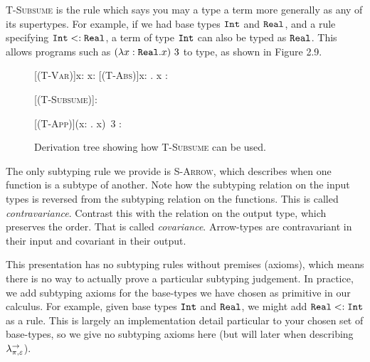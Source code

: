 \textsc{T-Subsume} is the rule which says you may a type a term more generally as any of its supertypes. For example, if we had base types $\mathtt{Int}$ and $\mathtt{Real}$, and a rule specifying $\mathtt{Int} <: \mathtt{Real}$, a term of type $\mathtt{Int}$ can also be typed as $\mathtt{Real}$. This allows programs such as $(\lambda x: \mathtt{Real}. x)~3$ to type, as shown in Figure 2.9.

\begin{figure}[h]


    \begin{prooftree*}
        [\textsc{(T-Var)}]{x: \Real \vdash x: \Real}
        [\textsc{(T-Abs)}]{\vdash \lambda x: \Real . x : \Real \rightarrow \Real }
        
        \Hypo{\Int <: \Real}
        [\textsc{(T-Subsume)}]{: \Real}
        
        [\textsc{(T-App)}]{\vdash (\lambda x: \Real . x)~3 : \Real}
 	\end{prooftree*}
 	
\vspace{-12pt}
\caption{Derivation tree showing how \textsc{T-Subsume} can be used.}
\label{This is the label.}
\end{figure}
 


The only subtyping rule we provide is \textsc{S-Arrow}, which describes when one function is a subtype of another. Note how the subtyping relation on the input types is reversed from the subtyping relation on the functions. This is called \textit{contravariance}. Contrast this with the relation on the output type, which preserves the order. That is called \textit{covariance}. Arrow-types are contravariant in their input and covariant in their output.

This presentation has no subtyping rules without premises (axioms), which means there is no way to actually prove a particular subtyping judgement. In practice, we add subtyping axioms for the base-types we have chosen as primitive in our calculus. For example, given base types $\mathtt{Int}$ and $\mathtt{Real}$, we might add $\mathtt{Real} <: \mathtt{Int}$ as a rule. This is largely an implementation detail particular to your chosen set of base-types, so we give no subtyping axioms here (but will later when describing $\lambda^{\rightarrow}_{\pi, \varepsilon}$).

